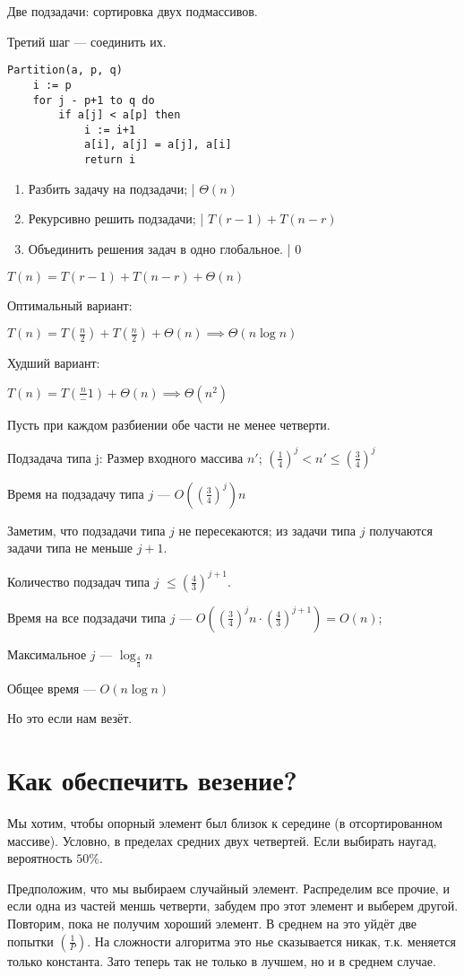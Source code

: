 ﻿\documentclass[12pt,a4paper]{article}
\begin{document}
Две подзадачи: сортировка двух подмассивов.

Третий шаг --- соединить их.

\begin{lstlisting}
Partition(a, p, q)
    i := p
    for j - p+1 to q do
        if a[j] < a[p] then
            i := i+1
            a[i], a[j] = a[j], a[i]
            return i
\end{lstlisting}

\begin{enumerate}
    \item Разбить задачу на подзадачи; | $\Theta(n)$
    \item Рекурсивно решить подзадачи; | $T(r-1) + T(n-r)$
    \item Объединить решения задач в одно глобальное. | $0$
\end{enumerate}

$T(n) = T(r-1) + T(n-r) + \Theta(n)$

Оптимальный вариант:

$T(n) = T(\frac n2) + T(\frac n2) + \Theta(n) \implies \Theta(n\log n)$

Худший вариант:

$T(n) = T(\frac n-1) + \Theta(n) \implies \Theta(n^2)$

Пусть при каждом разбиении обе части не менее четверти.

Подзадача типа j:
Размер входного массива $n'$; $\left( \frac14 \right)^j < n' \leqslant\left( \frac34 \right)^j$

Время на подзадачу типа $j$ --- $O\left( \left( \frac34 \right)^j \right)n$

Заметим, что подзадачи типа $j$ не пересекаются; из задачи типа $j$ получаются задачи типа не меньше $j+1$.

Количество подзадач типа $j$ $\leqslant \left( \frac43 \right)^{j+1}$.

Время на все подзадачи типа $j$ --- $O\left( \left( \frac34 \right)^jn\cdot\left( \frac43 \right)^{j+1} \right) = O(n)$;

Максимальное $j$ --- $\log_{\frac43}n$

Общее время --- $O(n\log n)$


Но это если нам везёт.

\section*{Как обеспечить везение?}

Мы хотим, чтобы опорный элемент был близок к середине (в отсортированном массиве). Условно, в пределах средних двух четвертей. Если выбирать наугад, вероятность $50\%$.

Предположим, что мы выбираем случайный элемент. Распределим все прочие, и если одна из частей меншь четверти, забудем про этот элемент и выберем другой. Повторим, пока не получим хороший элемент. В среднем на это уйдёт две попытки $\left( \frac1P \right)$. На сложности алгоритма это нье сказывается никак, т.к. меняется только константа. Зато теперь так не только в лучшем, но и в среднем случае.
\end{document}
